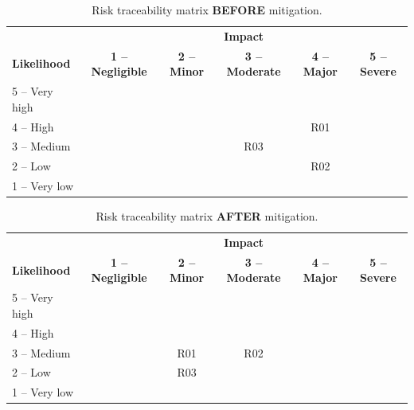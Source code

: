 \begin{table}[H]
    \centering
    \caption{Risk traceability matrix \textbf{BEFORE} mitigation.}
    \label{tab:risk-before}
    \renewcommand{\arraystretch}{1.4}
    \begin{tabular}{@{} l | c c c c c @{}}
        \toprule
                            & \multicolumn{5}{c}{\textbf{Impact}}                                                    \\
        \textbf{Likelihood} & \textbf{1 – Negligible}             & \textbf{2 – Minor}
                            & \textbf{3 – Moderate}               & \textbf{4 – Major} & \textbf{5 – Severe}         \\
        \midrule
        5 – Very high       &                                     &                    &                     &     & \\
        4 – High            &                                     &                    &                     & R01 & \\
        3 – Medium          &                                     &                    & R03                 &     & \\
        2 – Low             &                                     &                    &                     & R02 & \\
        1 – Very low        &                                     &                    &                     &     & \\
        \bottomrule
    \end{tabular}
\end{table}

\begin{table}[H]
    \centering
    \caption{Risk traceability matrix \textbf{AFTER} mitigation.}
    \label{tab:risk-after}
    \renewcommand{\arraystretch}{1.4}
    \begin{tabular}{@{} l | c c c c c @{}}
        \toprule
                            & \multicolumn{5}{c}{\textbf{Impact}}                                                 \\
        \textbf{Likelihood} & \textbf{1 – Negligible}             & \textbf{2 – Minor}
                            & \textbf{3 – Moderate}               & \textbf{4 – Major} & \textbf{5 – Severe}      \\
        \midrule
        5 – Very high       &                                     &                    &                     &  & \\
        4 – High            &                                     &                    &                     &  & \\
        3 – Medium          &                                     & R01                & R02                 &  & \\
        2 – Low             &                                     & R03                &                     &  & \\
        1 – Very low        &                                     &                    &                     &  & \\
        \bottomrule
    \end{tabular}
\end{table}
